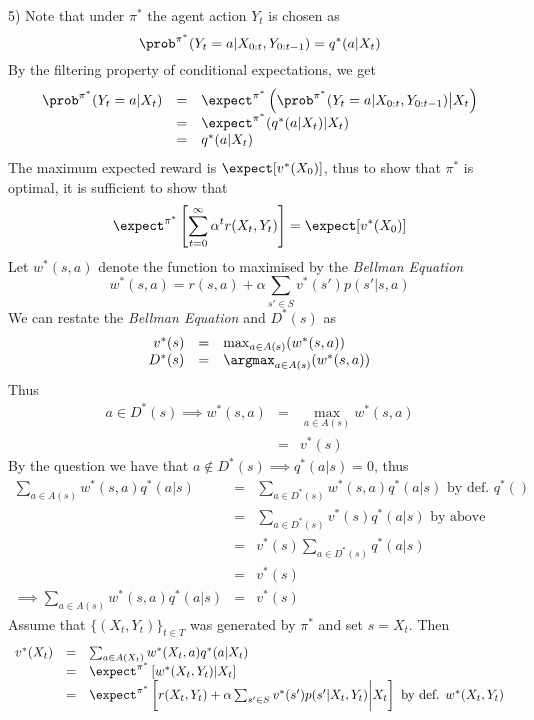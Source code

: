 \documentclass[11pt,a4paper]{article}
\begin{document}
\begin{answer}{5)}
  Note that under $\pi^*$ the agent action $Y_t$ is chosen as
  \[ \prob^{\pi^*}(Y_t=a|X_{0:t},Y_{0:t-1})=q^*(a|X_t) \]
  By the filtering property of conditional expectations, we get
  \[\begin{array}{rcl}
    \prob^{\pi^*}(Y_t=a|X_t)&=&\expect^{\pi^*}\left(\prob^{\pi^*}(Y_t=a|X_{0:t},Y_{0:t-1})\big|X_t\right)\\
    &=&\expect^{\pi^*}(q^*(a|X_t)|X_t)\\
    &=&q^*(a|X_t)
  \end{array}\]
  The maximum expected reward is $\expect[v^*(X_0)]$, thus to show that $\pi^*$ is optimal, it is sufficient to show that
  \[ \expect^{\pi^*}\left[\sum_{t=0}^\infty\alpha^tr(X_t,Y_t)\right]=\expect[v^*(X_0)] \]
  Let $w^*(s,a)$ denote the function to maximised by the \textit{Bellman Equation}
  \[ w^*(s,a)=r(s,a)+\alpha\sum_{s'\in S}v^*(s')p(s'|s,a) \]
  We can restate the \textit{Bellman Equation} and $D^*(s)$ as
  \[\begin{array}{rcl}
    v^*(s)&=&\max_{a\in A(s)}(w^*(s,a))\\
    D^*(s)&=&\argmax_{a\in A(s)}(w^*(s,a))
  \end{array}\]
  Thus
  \[\begin{array}{rcl}
    a\in D^*(s)\implies w^*(s,a)&=&\max_{a\in A(s)}w^*(s,a)\\
    &=&v^*(s)
  \end{array}\]
  By the question we have that $a\not\in D^*(s)\implies q^*(a|s)=0$, thus
  \[\begin{array}{rcl}
    \sum_{a\in A(s)}w^*(s,a)q^*(a|s)&=&\sum_{a\in D^*(s)}w^*(s,a)q^*(a|s)\text{ by def. }q^*()\\
    &=&\sum_{a\in D^*(s)}v^*(s)q^*(a|s)\text{ by above}\\
    &=&v^*(s)\sum_{a\in D^*(s)}q^*(a|s)\\
    &=&v^*(s)\\
    \implies\sum_{a\in A(s)}w^*(s,a)q^*(a|s)&=&v^*(s)
  \end{array}\]
  Assume that $\{(X_t,Y_t)\}_{t\in T}$ was generated by $\pi^*$ and set $s=X_t$. Then
  \[\begin{array}{rcl}
    v^*(X_t)&=&\sum_{a\in A(X_t)}w^*(X_t,a)q^*(a|X_t)\\
    &=&\expect^{\pi^*}\left[w^*(X_t,Y_t)|X_t\right]\\
    &=&\expect^{\pi^*}\left[r(X_t,Y_t)+\alpha\sum_{s'\in S}v^*(s')p(s'|X_t,Y_t)\bigg|X_t\right]\text{ by def. }w^*(X_t,Y_t)\\

\end{array}\]
\end{answer}
\end{document}
